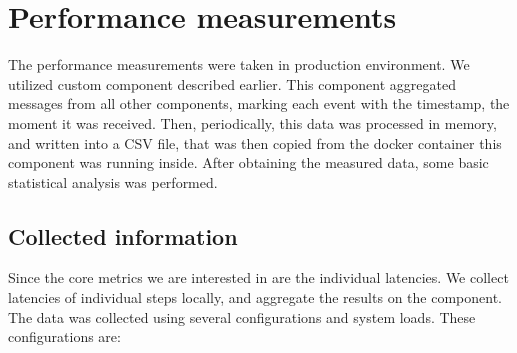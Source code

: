 \section{Performance measurements}
The performance measurements were taken in production environment. We utilized custom component described earlier. This component aggregated
messages from all other components, marking each event with the timestamp, the moment it was received. Then, periodically, this
data was processed in memory, and written into a CSV file, that was then copied from the docker container this component was
running inside. After obtaining the measured data, some basic statistical analysis was performed.

\subsection{Collected information}
Since the core metrics we are interested in are the individual latencies. We collect latencies of individual steps locally, and
aggregate the results on the  component. The data was collected using several configurations and system loads.
These configurations are:

